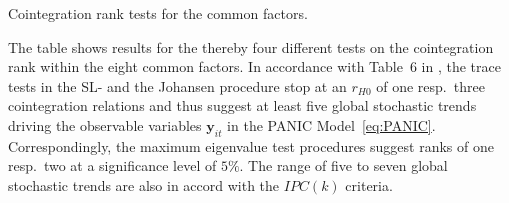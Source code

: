 \begin{table}[ht]	%
	\centering
	\caption[Cointegration rank tests]{Cointegration rank tests for the common factors.} 
	\resizebox{0.85\textwidth}{!}{
		}	
	\label{tab:MERMft}
\end{table}

The table shows results for the thereby four different tests on the cointegration rank within the eight common factors. In accordance with Table~6 in \citet[p.~68]{ArsovaOersal2017}, the trace tests in the SL- and the Johansen procedure stop at an $ r_{H0} $ of one resp.~three cointegration relations and thus suggest at least five global stochastic trends driving the observable variables $ \boldsymbol{y}_{it} $ in the PANIC Model~\eqref{eq:PANIC}. Correspondingly, the maximum eigenvalue test procedures suggest ranks of one resp.~two at a significance level of $ 5 \% $. The range of five to seven global stochastic trends are also in accord with the $ IPC(k) $ criteria.



